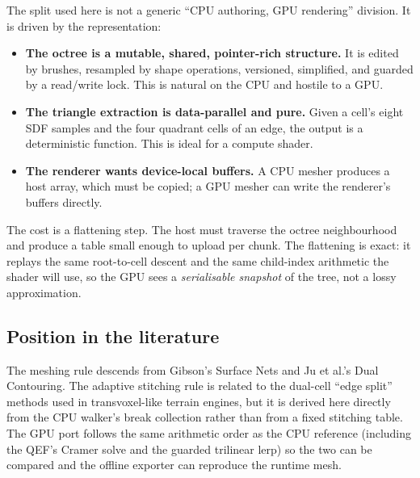The split used here is not a generic ``CPU authoring, GPU rendering''
division.  It is driven by the representation:

\begin{itemize}
\item \textbf{The octree is a mutable, shared, pointer-rich structure.}
  It is edited by brushes, resampled by shape operations, versioned,
  simplified, and guarded by a read/write lock.  This is natural on the CPU
  and hostile to a GPU.
\item \textbf{The triangle extraction is data-parallel and pure.}  Given a
  cell's eight SDF samples and the four quadrant cells of an edge, the
  output is a deterministic function.  This is ideal for a compute shader.
\item \textbf{The renderer wants device-local buffers.}  A CPU mesher
  produces a host array, which must be copied; a GPU mesher can write the
  renderer's buffers directly.
\end{itemize}

The cost is a flattening step.  The host must traverse the octree
neighbourhood and produce a table small enough to upload per chunk.  The
flattening is exact: it replays the same root-to-cell descent and the same
child-index arithmetic the shader will use, so the GPU sees a
\emph{serialisable snapshot} of the tree, not a lossy approximation.

\subsection{Position in the literature}

The meshing rule descends from Gibson's Surface Nets and Ju et al.'s Dual
Contouring.  The adaptive stitching rule is related to the dual-cell
``edge split'' methods used in transvoxel-like terrain engines, but it is
derived here directly from the CPU walker's break collection rather than
from a fixed stitching table.  The GPU port follows the same arithmetic
order as the CPU reference (including the QEF's Cramer solve and the
guarded trilinear lerp) so the two can be compared and the offline exporter
can reproduce the runtime mesh.
